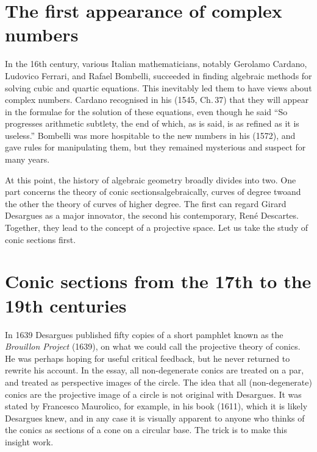 \section{The first appearance of complex numbers} 
In the 16th century, various Italian mathematicians, notably Gerolamo Cardano, Ludovico Ferrari,  and Rafael Bombelli, succeeded in finding algebraic methods for solving cubic and quartic equations. This inevitably led them to have views about complex numbers. Cardano recognised in his  (1545, Ch.\,37) that they will appear in the formulae for the solution of these equations, even though he said ``So progresses arithmetic subtlety, the end of which, as is said, is as refined as it is useless.'' Bombelli was more hospitable to the new numbers in his  (1572), and gave rules for manipulating them, but they remained mysterious and suspect for many years.



At this point, the history of algebraic geometry broadly divides into two. One part concerns the theory of conic sections\emdash algebraically, curves of degree two\emdash and the other the theory of curves of higher degree. The first can regard Girard Desargues as a major innovator, the second his contemporary,  Ren\'e Descartes. Together, they lead to the concept of a projective space. Let us take the study of conic sections first. 


\section{Conic sections from the 17th to the 19th centuries}
In 1639 Desargues published fifty copies of a short pamphlet known as the \emph{Brouillon Project} (1639), on what we could call the projective theory of conics. He was perhaps hoping for useful critical feedback, but he never returned to rewrite his account.  In the essay, all non-degenerate conics are treated on a par, and treated as perspective images of the circle. The idea that all (non-degenerate) conics are the projective image of a circle is not original with Desargues. It was stated by Francesco Maurolico, for example, in his book  (1611), which it is likely Desargues knew, and in any case it is visually apparent to anyone who thinks of the conics as sections of a cone on a circular base. The trick is to make this insight work.

